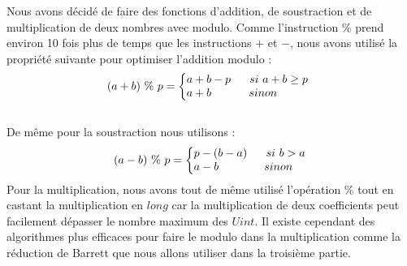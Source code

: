 \documentclass[12pt, a4paper]{article}
\begin{document}
Nous avons décidé de faire des fonctions d'addition, de soustraction et de multiplication de deux nombres avec modulo. Comme l'instruction $\%$ prend environ 10 fois plus de temps que les instructions $+$ et $-$, nous avons utilisé la propriété suivante pour optimiser l'addition modulo : \\
\[ (a+b)\ \%\ p = 
\left\{\begin{array}{@{}l@{}}
a + b - p\ \ \ \ \ si\ a+b \geq p\\
a + b\ \ \ \ \ \ \ \ \ \ sinon
\end{array}\right.\,\ \] \\
De même pour la soustraction nous utilisons :
\[ (a-b)\ \%\ p = 
\left\{\begin{array}{@{}l@{}}
p - (b - a)\ \ \ \ \ si\ b > a\\
a - b\ \ \ \ \ \ \ \ \ \ \ \ sinon
\end{array}\right.\,\]
\indent Pour la multiplication, nous avons tout de même utilisé l'opération $\%$ tout en castant la multiplication en $long$ car la multiplication de deux coefficients peut facilement dépasser le nombre maximum des $Uint$. Il existe cependant des algorithmes plus efficaces pour faire le modulo dans la multiplication comme la réduction de Barrett que nous allons utiliser dans la troisième partie.
\end{document}
